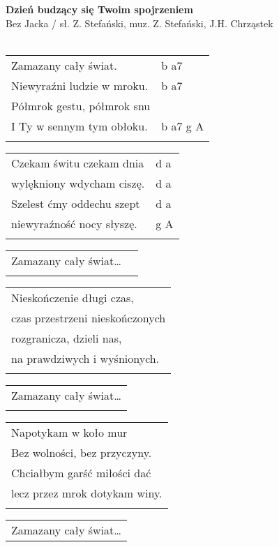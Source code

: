 \documentclass[a5paper]{article}
\begin{document}


\noindent
\fontsize{12pt}{15pt}\selectfont
\textbf{Dzień budzący się Twoim spojrzeniem} \\
\fontsize{8pt}{10pt}\selectfont
Bez Jacka / sł. Z. Stefański, muz. Z. Stefański, J.H. Chrząstek \\ \\

\fontsize{10pt}{12pt}\selectfont
{}
\begin{tabular}{@{}p{7.50cm}p{3cm}@{}}
\noindent
Zamazany cały świat. & b a7 \\
Niewyraźni ludzie w mroku. & b a7 \\
Półmrok gestu, półmrok snu & \\
I Ty w sennym tym obłoku. & b a7 g A \\ \\
\end{tabular}

\noindent
\begin{tabular}{@{}p{8.50cm}p{3cm}@{}}
Czekam świtu czekam dnia & d a \\
wylękniony wdycham ciszę. & d a \\
Szelest ćmy oddechu szept & d a \\
niewyraźność nocy słyszę. & g A \\ \\
\end{tabular}

\noindent
\begin{tabular}{@{}p{7.50cm}p{3cm}@{}}
Zamazany cały świat… \\ \\
\end{tabular}

\noindent
\begin{tabular}{@{}p{8.50cm}@{}}
Nieskończenie długi czas, \\
czas przestrzeni nieskończonych \\
rozgranicza, dzieli nas, \\
na prawdziwych i wyśnionych. \\ \\
\end{tabular}

\noindent
\begin{tabular}{@{}p{7.50cm}@{}}
Zamazany cały świat… \\ \\
\end{tabular}

\noindent
\begin{tabular}{@{}p{8.50cm}@{}}
Napotykam w koło mur \\
Bez wolności, bez przyczyny. \\
Chciałbym garść miłości dać \\
lecz przez mrok dotykam winy. \\ \\
\end{tabular}

\noindent
\begin{tabular}{@{}p{7.50cm}@{}}
Zamazany cały świat…
\end{tabular}
\end{document}
